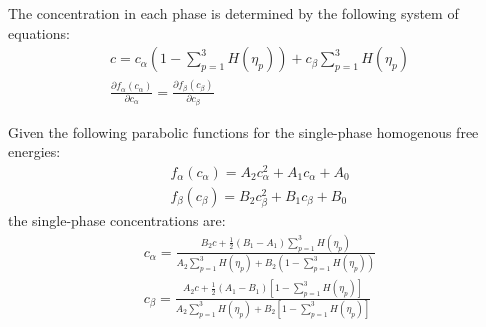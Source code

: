 \documentclass[11pt]{article}
\renewcommand{\=}[1]{\stackrel{#1}{=}} %
\theoremstyle{definition}
\theoremstyle{remark}
\begin{document}
The concentration in each phase is determined by the following system of equations:
\begin{gather}
c =  c_{\alpha} \left( 1- \sum_{p=1}^3 H(\eta_p)\right) + c_{\beta} \sum_{p=1}^3 H(\eta_p) \\
\frac{\partial f_{\alpha}(c_{\alpha})}{\partial c_{\alpha}} = \frac{\partial f_{\beta}(c_{\beta})}{\partial c_{\beta}}
\end{gather}

Given the following parabolic functions for the single-phase homogenous free energies:
\begin{gather}
f_{\alpha}(c_{\alpha}) = A_{2} c_{\alpha}^2 + A_{1} c_{\alpha} + A_{0} \\
f_{\beta}(c_{\beta}) = B_{2} c_{\beta}^2 + B_{1} c_{\beta} + B_{0}
\end{gather}
the single-phase concentrations are:
\begin{gather}
c_{\alpha} = \frac{ B_2 c + \frac{1}{2} (B_1 - A_1) \sum_{p=1}^3 H(\eta_p) }{A_2 \sum_{p=1}^3 H(\eta_p) + B_2 \left( 1- \sum_{p=1}^3 H(\eta_p)\right) } \\
c_{\beta} =  \frac{ A_2 c + \frac{1}{2} (A_1 - B_1) \left[1-\sum_{p=1}^3 H(\eta_p)\right] }{A_2 \sum_{p=1}^3 H(\eta_p) + B_2 \left[ 1- \sum_{p=1}^3 H(\eta_p)\right] } 
\end{gather}
\end{document}
